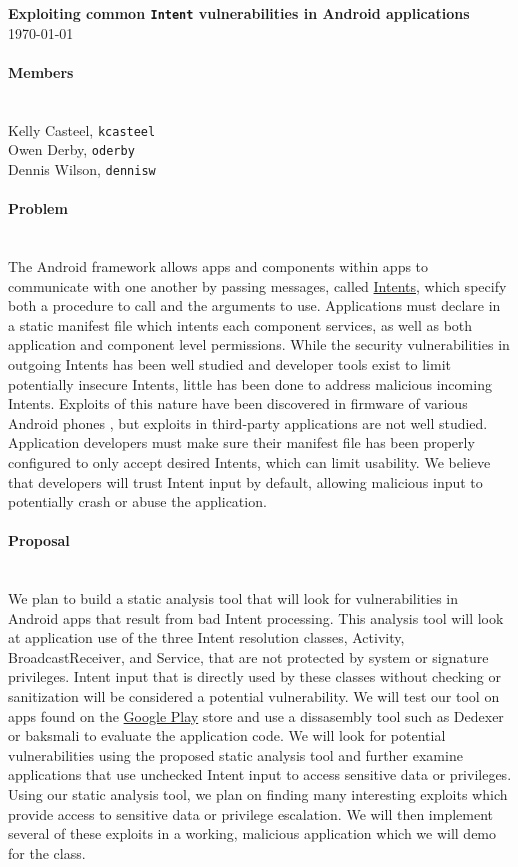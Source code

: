 \documentclass[12pt,a4paper]{article}
\begin{document}


\flushleft\textbf{Exploiting common \texttt{Intent} vulnerabilities in Android %
applications}\\
\today\\

\paragraph{Members} ~\\

Kelly Casteel, \texttt{kcasteel}\\
Owen Derby, \texttt{oderby}\\
Dennis Wilson, \texttt{dennisw}\\

\paragraph{Problem} ~\\
The Android framework allows apps and components within apps to communicate with
one another by passing messages, called
\href{https://developer.android.com/reference/android/content/Intent.html}{Intents},
which specify both a procedure to call and the arguments to use. Applications
must declare in a static manifest file which intents each component services, as
well as both application and component level permissions. While the security
vulnerabilities in outgoing Intents has been well studied
\cite{chin_analyzing_2011} and developer tools exist to limit potentially
insecure Intents, little has been done to address malicious incoming
Intents. Exploits of this nature have been discovered in firmware of various
Android phones \cite{grace_systematic_2012}, but exploits in third-party
applications are not well studied. Application developers must make sure their
manifest file has been properly configured to only accept desired Intents, which
can limit usability. We believe that developers will trust Intent input by
default, allowing malicious input to potentially crash or abuse the application.

\paragraph{Proposal} ~\\
We plan to build a static analysis tool that will look for vulnerabilities in
Android apps that result from bad Intent processing. This analysis tool will
look at application use of the three Intent resolution classes, Activity,
BroadcastReceiver, and Service, that are not protected by system or signature
privileges. Intent input that is directly used by these classes without checking
or sanitization will be considered a potential vulnerability. We will test our
tool on apps found on the \href{https://play.google.com/store/apps}{Google Play}
store and use a dissasembly tool such as Dedexer \cite{dedexer} or
baksmali \cite{baksmali} to evaluate the application code. We will look for
potential vulnerabilities using the proposed static analysis tool and further
examine applications that use unchecked Intent input to access sensitive data or
privileges.\\

Using our static analysis tool, we plan on finding many interesting exploits
which provide access to sensitive data or privilege escalation. We will then
implement several of these exploits in a working, malicious application which we
will demo for the class.


\end{document}

